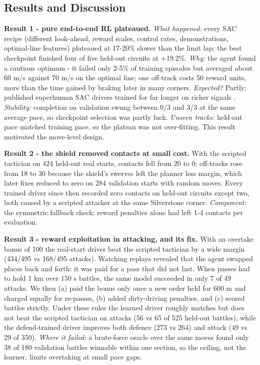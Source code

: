 \documentclass{ieeeaccess}
\begin{document}
\subsection{Results and Discussion}

\textbf{Result 1 - pure end-to-end RL plateaued.} \emph{What happened:} every SAC recipe
(different look-ahead, reward scales, control rates, demonstrations, optimal-line
features) plateaued at 17-20\% slower than the limit lap; the best checkpoint
finished four of five held-out circuits at +19.2\%. \emph{Why:} the agent found a
cautious optimum - it failed only 2-5\% of training episodes but averaged about
60 m/s against 70 m/s on the optimal line; one off-track costs 50 reward units,
more than the time gained by braking later in many corners. \emph{Expected?} Partly;
published superhuman SAC drivers trained for far longer on richer signals \cite{b13}.
\emph{Stability:} completion on validation swung between 0/3 and 3/3 at the same average
pace, so checkpoint selection was partly luck. \emph{Unseen tracks:} held-out pace
matched training pace, so the plateau was not over-fitting. This result motivated
the move-level design.

\textbf{Result 2 - the shield removed contacts at small cost.} With the scripted
tactician on 424 held-out real starts, contacts fell from 20 to 0; off-tracks rose
from 18 to 30 because the shield's swerves left the planner less margin, which later
fixes reduced to zero on 284 validation starts with random moves. Every trained
driver since then recorded zero contacts on held-out circuits except two, both
caused by a scripted attacker at the same Silverstone corner. \emph{Component:} the
symmetric fallback check; reward penalties alone had left 1-4 contacts per
evaluation.

\textbf{Result 3 - reward exploitation in attacking, and its fix.} With an overtake
bonus of 100 the real-start driver beat the scripted tactician by a wide margin
(434/495 vs 168/495 attacks). Watching replays revealed that the agent swapped
places back and forth: it was paid for a pass that did not last. When passes had to
hold 1 km over 150 s battles, the same model succeeded in only 7 of 49 attacks. We
then (a) paid the bonus only once a new order held for 600 m and charged equally
for re-passes, (b) added dirty-driving penalties, and (c) scored battles strictly.
Under these rules the learned driver roughly matches but does not beat the scripted
tactician on attacks (56 vs 65 of 525 held-out battles), while the defend-trained
driver improves both defence (273 vs 264) and attack (49 vs 29 of 350). \emph{Where it
failed:} a brute-force oracle over the same moves found only 38 of 180 validation
battles winnable within one section, so the ceiling, not the learner, limits
overtaking at small pace gaps.
\end{document}
